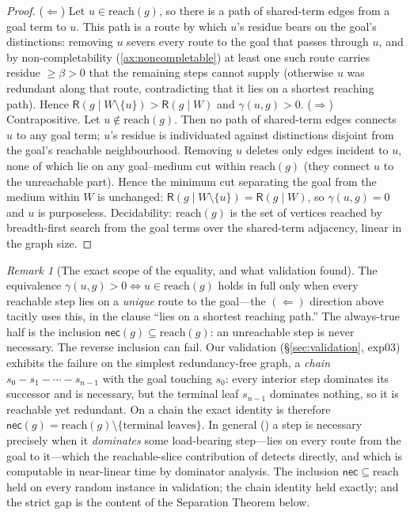 \documentclass[11pt,twocolumn,a4paper]{article}
\theoremstyle{thmstyle}
\theoremstyle{definition}
\theoremstyle{remark}
\newtheorem{remark}[theorem]{Remark}
\newcommand{\flo}{\beta}                %
\newcommand{\goal}{g}                   %
\newcommand{\reach}{\mathrm{reach}}
\newcommand{\Res}{\mathsf{R}}           %
\newcommand{\contrib}{\gamma}           %
\newcommand{\nec}{\textsf{nec}}
\newcommand{\set}[1]{\{#1\}}
\begin{document}
\begin{proof}
($\Leftarrow$) Let $u\in\reach(\goal)$, so there is a path of shared-term edges
from a goal term to $u$. This path is a route by which $u$'s residue bears on the
goal's distinctions: removing $u$ severs every route to the goal that passes
through $u$, and by non-completability (\cref{ax:noncompletable}) at least one
such route carries residue $\ge\flo>0$ that the remaining steps cannot supply
(otherwise $u$ was redundant along that route, contradicting that it lies on a
shortest reaching path). Hence $\Res(\goal\mid W\setminus\set u)>\Res(\goal\mid W)$
and $\contrib(u,\goal)>0$.
($\Rightarrow$) Contrapositive. Let $u\notin\reach(\goal)$. Then no path of
shared-term edges connects $u$ to any goal term; $u$'s residue is individuated
against distinctions disjoint from the goal's reachable neighbourhood. Removing
$u$ deletes only edges incident to $u$, none of which lie on any goal--medium
cut within $\reach(\goal)$ (they connect $u$ to the unreachable part). Hence the
minimum cut separating the goal from the medium within $W$ is unchanged:
$\Res(\goal\mid W\setminus\set u)=\Res(\goal\mid W)$, so $\contrib(u,\goal)=0$ and
$u$ is purposeless. Decidability: $\reach(\goal)$ is the set of vertices reached
by breadth-first search from the goal terms over the shared-term adjacency,
linear in the graph size.
\end{proof}

\begin{remark}[The exact scope of the equality, and what validation found]
\label{rem:necessity-scope}
The equivalence $\contrib(u,\goal)>0\iff u\in\reach(\goal)$ holds in full only
when every reachable step lies on a \emph{unique} route to the goal---the
$(\Leftarrow)$ direction above tacitly uses this, in the clause ``lies on a
shortest reaching path.'' The always-true half is the inclusion
$\nec(\goal)\subseteq\reach(\goal)$: an unreachable step is never necessary. The
reverse inclusion can fail. Our validation (\S\ref{sec:validation}, exp03)
exhibits the failure on the simplest redundancy-free graph, a \emph{chain}
$s_0\!-\!s_1\!-\!\cdots\!-\!s_{n-1}$ with the goal touching $s_0$: every interior
step dominates its successor and is necessary, but the terminal leaf $s_{n-1}$
dominates nothing, so it is reachable yet redundant. On a chain the exact
identity is therefore $\nec(\goal)=\reach(\goal)\setminus\{\text{terminal
leaves}\}$. In general () a step is necessary precisely when
it \emph{dominates} some load-bearing step---lies on every route from the goal to
it---which the reachable-slice contribution of  detects
directly, and which is computable in near-linear time by dominator analysis. The
inclusion $\nec\subseteq\reach$ held on every random instance in validation; the
chain identity held exactly; and the strict gap is the content of the Separation
Theorem below.
\end{remark}
\end{document}
